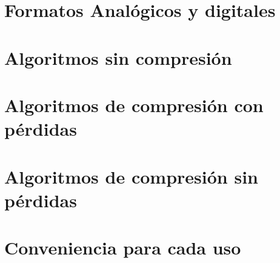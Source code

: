 \documentclass{beamer}
\begin{document}
\section{Formatos Analógicos y digitales}
\section{Algoritmos sin compresión}
\section{Algoritmos de compresión con pérdidas}
\section{Algoritmos de compresión sin pérdidas}
\section{Conveniencia para cada uso}
\end{document}
